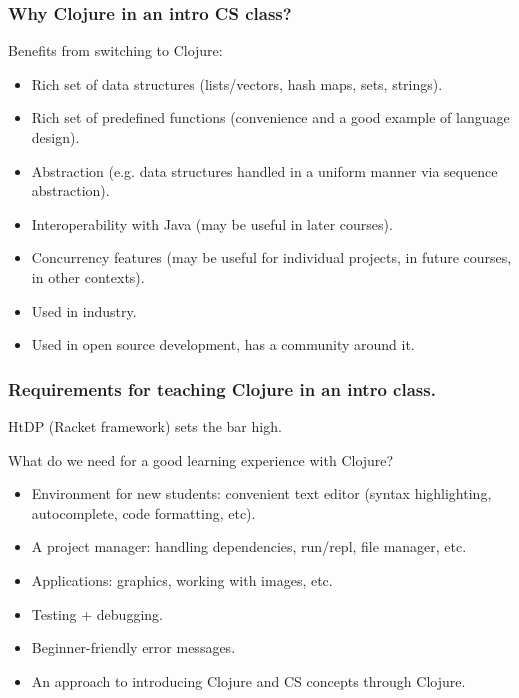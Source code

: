 \documentclass{beamer}
\begin{document}

\begin{frame}
  \frametitle{Why Clojure in an intro CS class?}
Benefits from switching to Clojure:
\begin{itemize}
\item Rich set of data structures (lists/vectors, hash maps, sets, strings).
\item Rich set of predefined functions (convenience and a good example of language design). 
\item Abstraction (e.g. data structures handled in a uniform manner via sequence abstraction). 
\item Interoperability with Java (may be useful in later courses).
\item Concurrency features (may be useful for individual projects, in future courses, in other contexts). 
\item Used in industry.
\item Used in open source development, has a community around it. 
\end{itemize}
\end{frame}


\begin{frame}
  \frametitle{Requirements for teaching Clojure in an intro class.}
HtDP (Racket framework) sets the bar high.

What do we need for a good learning experience with Clojure?
\begin{itemize}
\item Environment for new students: convenient text editor (syntax highlighting, autocomplete, code formatting, etc).
\item A project manager: handling dependencies, run/repl, file manager, etc. 
\item Applications: graphics, working with images, etc. 
\item Testing + debugging. 
\item Beginner-friendly error messages. 
\item An approach to introducing Clojure and CS concepts through Clojure. 
\end{itemize}
\end{frame}
\end{document}
